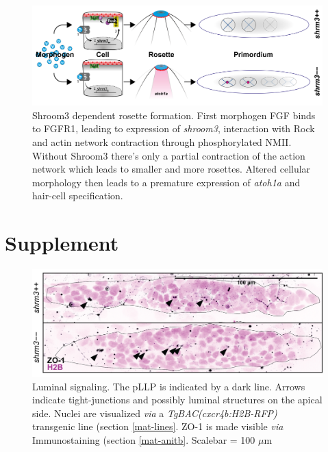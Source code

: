 \documentclass[10pt, b5paper, singlespacinge, twoside]{reedthesis} %
\theoremstyle{definition}
\theoremstyle{definition}
\theoremstyle{definition}
\theoremstyle{remark}
\begin{document}
\begin{figure}[H]

{\centering \includegraphics[width=0.95\linewidth]{figures/summary/CurrentModel_new-01} 

}

\caption[Shroom3 dependent rosette formation]{Shroom3 dependent rosette formation. First morphogen FGF binds to FGFR1, leading to expression of \emph{shroom3}, interaction with Rock and actin network contraction through phosphorylated NMII. Without Shroom3 there's only a partial contraction of the action network which leads to smaller and more rosettes. Altered cellular morphology then leads to a premature expression of \emph{atoh1a} and hair-cell specification.}\label{fig:summodel}
\end{figure}
\appendix

\hypertarget{supplement}{%
\chapter*{Supplement}\label{supplement}}


\begin{figure}[H]

{\centering \includegraphics[width=0.7\linewidth]{figures/supp/zo1} 

}

\caption[Luminal signaling]{Luminal signaling. The pLLP is indicated by a dark line. Arrows indicate tight-junctions and possibly luminal structures on the apical side. Nuclei are visualized \emph{via} a \emph{TgBAC(cxcr4b:H2B-RFP)} transgenic line (section \ref{mat-lines}. ZO-1 is made visible \emph{via} Immunostaining (section \ref{mat-anitb}. Scalebar = 100 \(\mu\)m}\label{fig:suppzo1}
\end{figure}
\end{document}
